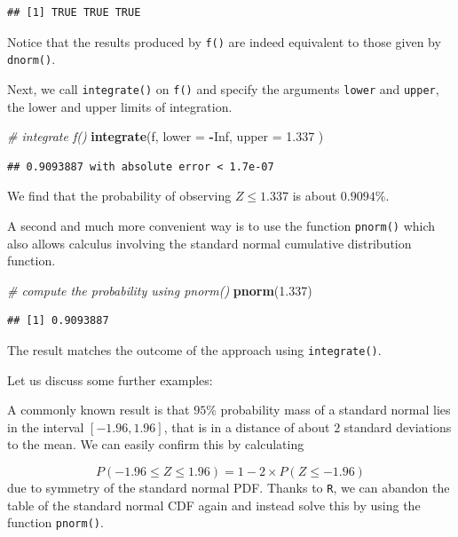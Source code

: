 \documentclass[]{book}
\newenvironment{Shaded}{\begin{snugshade}}{\end{snugshade}}
\newcommand{\KeywordTok}[1]{\textcolor[rgb]{0.13,0.29,0.53}{\textbf{#1}}}
\newcommand{\DataTypeTok}[1]{\textcolor[rgb]{0.13,0.29,0.53}{#1}}
\newcommand{\FloatTok}[1]{\textcolor[rgb]{0.00,0.00,0.81}{#1}}
\newcommand{\CommentTok}[1]{\textcolor[rgb]{0.56,0.35,0.01}{\textit{#1}}}
\newcommand{\OtherTok}[1]{\textcolor[rgb]{0.56,0.35,0.01}{#1}}
\newcommand{\OperatorTok}[1]{\textcolor[rgb]{0.81,0.36,0.00}{\textbf{#1}}}
\newcommand{\NormalTok}[1]{#1}
\theoremstyle{definition}
\theoremstyle{definition}
\theoremstyle{definition}
\theoremstyle{remark}
\begin{document}
\begin{verbatim}
## [1] TRUE TRUE TRUE
\end{verbatim}

Notice that the results produced by \texttt{f()} are indeed equivalent
to those given by \texttt{dnorm()}.

Next, we call \texttt{integrate()} on \texttt{f()} and specify the
arguments \texttt{lower} and \texttt{upper}, the lower and upper limits
of integration.

\begin{Shaded}
\begin{Highlighting}[]
\CommentTok{# integrate f()}
\KeywordTok{integrate}\NormalTok{(f, }
          \DataTypeTok{lower =} \OperatorTok{-}\OtherTok{Inf}\NormalTok{, }
          \DataTypeTok{upper =} \FloatTok{1.337}
\NormalTok{          )}
\end{Highlighting}
\end{Shaded}

\begin{verbatim}
## 0.9093887 with absolute error < 1.7e-07
\end{verbatim}

We find that the probability of observing \(Z \leq 1.337\) is about
\(0.9094\%\).

A second and much more convenient way is to use the function
\texttt{pnorm()} which also allows calculus involving the standard
normal cumulative distribution function.

\begin{Shaded}
\begin{Highlighting}[]
\CommentTok{# compute the probability using pnorm()}
\KeywordTok{pnorm}\NormalTok{(}\FloatTok{1.337}\NormalTok{)}
\end{Highlighting}
\end{Shaded}

\begin{verbatim}
## [1] 0.9093887
\end{verbatim}

The result matches the outcome of the approach using
\texttt{integrate()}.

Let us discuss some further examples:

A commonly known result is that \(95\%\) probability mass of a standard
normal lies in the interval \([-1.96, 1.96]\), that is in a distance of
about \(2\) standard deviations to the mean. We can easily confirm this
by calculating

\[ P(-1.96 \leq Z \leq 1.96) = 1-2\times P(Z \leq -1.96) \] due to
symmetry of the standard normal PDF. Thanks to \texttt{R}, we can
abandon the table of the standard normal CDF again and instead solve
this by using the function \texttt{pnorm()}.
\end{document}
